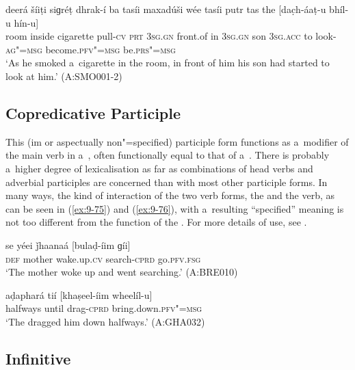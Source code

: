 \begin{exe}
\ex
\label{ex:9-74}
\gll deerá šíiṭi siɡréṭ dhrak-í ba tasíi maxadúši wée tasíi putr tas the [dac̣h-áaṭ-u bhíl-u hín-u] \\
room inside cigarette pull-\textsc{cv} \textsc{prt} \textsc{3sg.gn} front.of in \textsc{3sg.gn} son \textsc{3sg.acc} to look-\textsc{ag"=msg} become.\textsc{pfv"=msg} be.\textsc{prs"=msg } \\
\glt `As he smoked a~cigarette in the room, in front of him his son had started to look at him.' (A:SMO001-2)
\end{exe}

\subsection{Copredicative Participle}
\label{subsec:9-3-5}

This (im or aspectually non"=specified) participle form functions as a~modifier of the main verb in a~, often functionally equal to that of a~. There is probably a~higher degree of lexicalisation as far as combinations of head verbs and adverbial participles are concerned than with most other participle forms. In many ways, the kind of interaction of the two verb forms, the  and the  verb, as can be seen in (\ref{ex:9-75}) and (\ref{ex:9-76}), with a~resulting ``specified'' meaning is not too different from the function of the . For more details of use, see . 

\begin{exe}
\ex
\label{ex:9-75}
\gll se yéei ǰhaanaá [bulaḍ-íim ɡíi]  \\
\textsc{def} mother wake.up.\textsc{cv} search-\textsc{cprd} go.\textsc{pfv.fsg} \\
\glt `The mother woke up and went searching.' (A:BRE010)

\ex
\label{ex:9-76}
\gll aḍaphará tií [khaṣeel-íim wheelíl-u] \\
halfways until drag-\textsc{cprd} bring.down.\textsc{pfv"=msg} \\
\glt `The dragged him down halfways.' (A:GHA032)
\end{exe}

\subsection{Infinitive}
\label{subsec:9-3-6}

